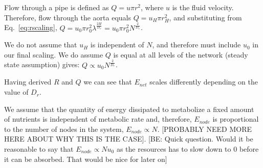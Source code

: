 \documentclass[12pt]{article}
\begin{document}
Flow through a pipe is defined as $Q = u\pi r^2$, where $u$ is the fluid
velocity. 
Therefore, flow through the aorta equals $Q = u_H \pi r_{H}^2$, and
substituting from Eq.~\ref{eq:rscaling}, $Q = u_0 \pi r_0^2
\lambda^{\frac{2H}{D_r}} = u_0 \pi r_0^2N^{\frac{2}{D_r}} $. 

We do not assume that $u_H$ is independent of $N$, and therefore must include
$u_0$ in our final scaling. We do assume $Q$ is equal at all levels of the
network (steady state assumption) gives: $ Q \propto u_0 N^{\frac{2}{D_r}}$. 

Having derived $R$ and $Q$ we can see that $E_{net}$ scales differently
depending on the value of $D_r$.

\begin{caseof}

\end{caseof}


%


We assume that the quantity of energy dissipated to metabolize a fixed amount
of nutrients is independent of metabolic rate and, therefore, $E_{node}$ is
proportional to the number of nodes in the system, $E_{node} \propto N$.
[PROBABLY NEED MORE HERE ABOUT WHY THIS IS THE CASE]. 
[BE: Quick question. Would it be reasonable to say that $E_{node} \propto N
  u_0$ as the resources has to slow down to 0 before it can be absorbed. That
would be nice for later on]
\end{document}
